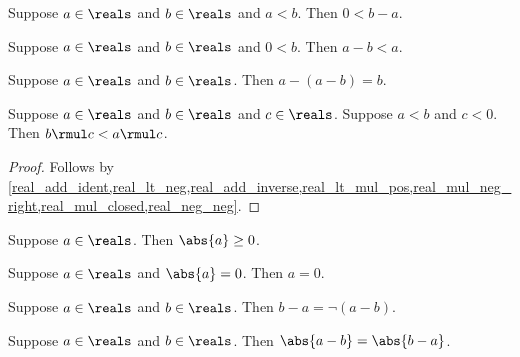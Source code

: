 \begin{lemma}\label{real_lt_imp_pos_diff}
    Suppose $a\in\reals$ and $b\in\reals$ and $a < b$.
    Then $0 < b - a$.
\end{lemma}

\begin{lemma}\label{real_sub_pos_lt}
    Suppose $a\in\reals$ and $b\in\reals$ and $0 < b$.
    Then $a - b < a$.
\end{lemma}

\begin{lemma}\label{real_sub_sub_cancel}
    Suppose $a\in\reals$ and $b\in\reals$.
    Then $a - (a - b) = b$.
\end{lemma}

\begin{proposition}\label{real_lt_mul_neg}
    Suppose $a\in\reals$ and $b\in\reals$ and $c\in\reals$.
    Suppose $a < b$ and $c < 0$.
    Then $b \rmul c < a \rmul c$.
\end{proposition}
\begin{proof}
    Follows by \cref{real_add_ident,real_lt_neg,real_add_inverse,real_lt_mul_pos,real_mul_neg_right,real_mul_closed,real_neg_neg}.
\end{proof}

\begin{proposition}\label{real_abs_nonnegative}
    Suppose $a\in\reals$.
    Then $\abs{a} \geq 0$.
\end{proposition}

\begin{proposition}\label{real_abs_eq_zero}
    Suppose $a\in\reals$ and $\abs{a} = 0$.
    Then $a = 0$.
\end{proposition}

\begin{lemma}\label{real_sub_swap_neg}
    Suppose $a\in\reals$ and $b\in\reals$.
    Then $b - a = \neg{(a - b)}$.
\end{lemma}

\begin{proposition}\label{real_abs_sub_swap}
    Suppose $a\in\reals$ and $b\in\reals$.
    Then $\abs{a - b} = \abs{b - a}$.
\end{proposition}

